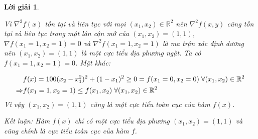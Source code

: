 \documentclass[14pt, a4paper]{article}
\theoremstyle{sltheorem}
\theoremstyle{soltheorem}
\newtheorem*{loigiai}{Lời giải}
\begin{document}
\begin{loigiai}
\begin{enumerate} [wide, labelwidth=!, labelindent=0pt,label=\textbf{\arabic*}.]
            Vì $\nabla^2 f(x)$ tồn tại và liên tục với mọi $(x_1, x_2) \in \mathbb{R}^{2}$ nên $\nabla^2 f(x, y)$ cũng tồn tại và liên tục trong một lân cận mở của $(x_1, x_2)=(1,1)$, $\nabla f(x_1=1, x_2=1)=0$ và $\nabla^2 f(x_1=1, x_2=1)$ là ma trận xác định dương nên $(x_1, x_2)=(1, 1)$ là một cực tiểu địa phương ngặt. Ta có $f(x_1=1, x_2=1)=0$. Mặt khác:

            \begin{equation*}
                \begin{aligned}
                    &f(x)=100(x_2 - x_1^2)^2 + (1-x_1)^2 \geq 0 = f(x_1=0,x_2=0) \thickspace \forall (x_1, x_2) \in \mathbb{R}^{2} \\
                    \Rightarrow&f(x_1=1,x_2=1) \leq f(x_1, x_2) \thickspace \forall (x_1, x_2) \in \mathbb{R}^{2}
                \end{aligned}
            \end{equation*}
            Vì vậy $(x_1, x_2)=(1, 1)$ cũng là một cực tiểu toàn cục của hàm $f(x)$.

            Kết luận: Hàm $f(x)$ chỉ có một cực tiểu địa phương $(x_1, x_2)=(1,1)$ và cũng chính là cực tiểu toàn cục của hàm $f$.
        \end{enumerate}
    \end{loigiai}

    \newpage
    \printbibliography[title={TÀI LIỆU THAM KHẢO}]
\end{document}
